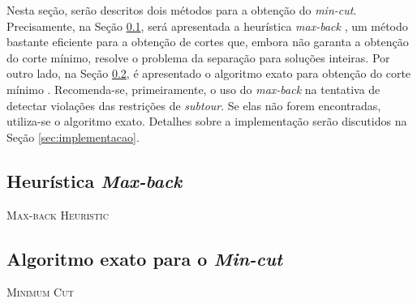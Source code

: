 

Nesta seção, serão descritos dois métodos para a obtenção do \textit{min-cut}. Precisamente, na Seção \ref{sec:maxBack}, será apresentada a heurística \textit{max-back} \cite{denisnaddef}, um método bastante eficiente para a obtenção de cortes que, embora não garanta a obtenção do corte mínimo, resolve o problema da separação para soluções inteiras. Por outro lado, na Seção \ref{sec:minCut}, é apresentado o algoritmo exato para obtenção do corte mínimo \cite{Stoer:1997:SMA:263867.263872}. Recomenda-se, primeiramente, o uso do \textit{max-back} na tentativa de detectar violações das restrições de \textit{subtour}. Se elas não forem encontradas, utiliza-se o algoritmo exato. Detalhes sobre a implementação serão discutidos na Seção \ref{sec:implementacao}.    

\subsection{Heurística \textit{Max-back}} \label{sec:maxBack}

\begin{algorithm}[h]
\DontPrintSemicolon
{}
\KwResult{}
\Begin{

	\Return{} \;
}
\caption{\textsc{Max-back Heuristic}\label{alg:maxback}}
\end{algorithm}


\subsection{Algoritmo exato para o \textit{Min-cut}} \label{sec:minCut}

\begin{algorithm}[h]
\DontPrintSemicolon
{}
\KwResult{}
\Begin{

	\Return{} \;
}
\caption{\textsc{Minimum Cut}\label{alg:maxback}}
\end{algorithm}


